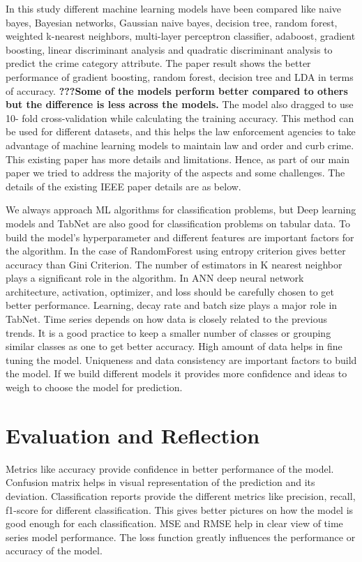 \documentclass[conference,final,]{IEEEtran}
\begin{document}
In this study different machine learning models have been compared like
naive bayes, Bayesian networks, Gaussian naive bayes, decision tree,
random forest, weighted k-nearest neighbors, multi-layer perceptron
classifier, adaboost, gradient boosting, linear discriminant analysis
and quadratic discriminant analysis to predict the crime category
attribute. The paper result shows the better performance of gradient
boosting, random forest, decision tree and LDA in terms of accuracy.
\textbf{???Some of the models perform better compared to others but the
difference is less across the models.} The model also dragged to use 10-
fold cross-validation while calculating the training accuracy. This
method can be used for different datasets, and this helps the law
enforcement agencies to take advantage of machine learning models to
maintain law and order and curb crime. This existing paper has more
details and limitations. Hence, as part of our main paper we tried to
address the majority of the aspects and some challenges. The details of
the existing IEEE paper details are as below.

We always approach ML algorithms for classification problems, but Deep
learning models and TabNet are also good for classification problems on
tabular data. To build the model's hyperparameter and different features
are important factors for the algorithm. In the case of RandomForest
using entropy criterion gives better accuracy than Gini Criterion. The
number of estimators in K nearest neighbor plays a significant role in
the algorithm. In ANN deep neural network architecture, activation,
optimizer, and loss should be carefully chosen to get better
performance. Learning, decay rate and batch size plays a major role in
TabNet. Time series depends on how data is closely related to the
previous trends. It is a good practice to keep a smaller number of
classes or grouping similar classes as one to get better accuracy. High
amount of data helps in fine tuning the model. Uniqueness and data
consistency are important factors to build the model. If we build
different models it provides more confidence and ideas to weigh to
choose the model for prediction.

\section{Evaluation and Reflection}\label{evaluation-and-reflection}

Metrics like accuracy provide confidence in better performance of the
model. Confusion matrix helps in visual representation of the prediction
and its deviation. Classification reports provide the different metrics
like precision, recall, f1-score for different classification. This
gives better pictures on how the model is good enough for each
classification. MSE and RMSE help in clear view of time series model
performance. The loss function greatly influences the performance or
accuracy of the model.
\end{document}
